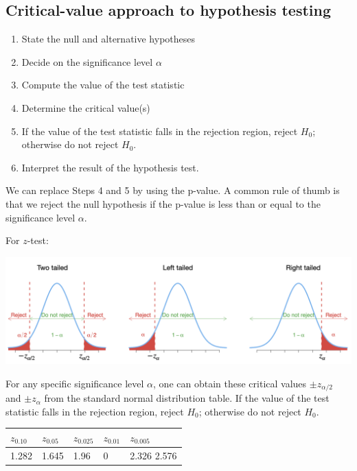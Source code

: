 \documentclass[
]{article}
\begin{document}
\hypertarget{critical-value-approach-to-hypothesis-testing-1}{%
\subsection{Critical-value approach to hypothesis
testing}\label{critical-value-approach-to-hypothesis-testing-1}}

\begin{enumerate}
\def\labelenumi{\arabic{enumi}.}
\item
  State the null and alternative hypotheses
\item
  Decide on the significance level \(\alpha\)
\item
  Compute the value of the test statistic
\item
  Determine the critical value(s)
\item
  If the value of the test statistic falls in the rejection region,
  reject \(H_0\); otherwise do not reject \(H_0\).
\item
  Interpret the result of the hypothesis test.
\end{enumerate}

We can replace Steps 4 and 5 by using the p-value. A common rule of
thumb is that we reject the null hypothesis if the p-value is less than
or equal to the significance level \(\alpha\).

For \(z\)-test:

\begin{center}\includegraphics[width=1\linewidth,height=1.3\textheight]{hytestz1} \end{center}

For any specific significance level \(\alpha\), one can obtain these
critical values \(\pm z_{\alpha/2}\) and \(\pm z_{\alpha}\) from the
standard normal distribution table. If the value of the test statistic
falls in the rejection region, reject \(H_0\); otherwise do not reject
\(H_0\).

\begin{longtable}[]{@{}lllll@{}}
\toprule()
\(z_{0.10}\) & \(z_{0.05}\) & \(z_{0.025}\) & \(z_{0.01}\) &
\(z_{0.005}\) \\
\midrule()
\endhead
1.282 & 1.645 & 1.96 & 0 & 2.326 2.576 \\
\bottomrule()
\end{longtable}
\end{document}
